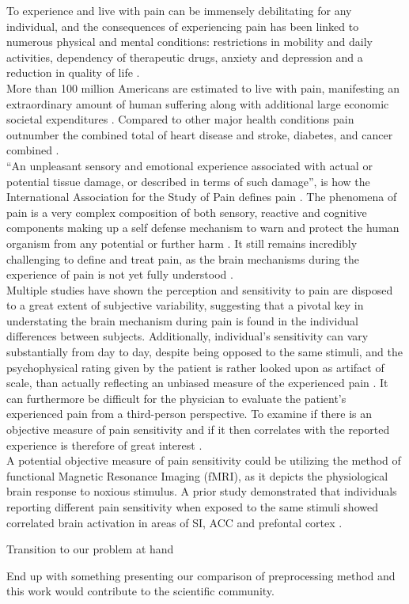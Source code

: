 
To experience and live with pain can be immensely debilitating for any individual, and the consequences of experiencing pain has been linked to numerous physical and mental conditions: restrictions in mobility and daily activities, dependency of therapeutic drugs, anxiety and depression and a reduction in quality of life \cite{Dahlhamer2018,NationalCenterforHealthStatisticsHealth2011}. \\ More than 100 million Americans are estimated to live with pain, manifesting an extraordinary amount of human suffering along with additional large economic societal expenditures \cite{InstituteofMedicine2011}. Compared to other major health conditions pain outnumber the combined total of heart disease and stroke, diabetes, and cancer combined \cite{NationalCenterforHealthStatisticsHealth2011}. \\
“An unpleasant sensory and emotional experience associated with actual or potential tissue damage, or described in terms of such damage”, is how the International Association for the Study of Pain defines pain \cite{Merskey1994}. The phenomena of pain is a very complex composition of both sensory, reactive and cognitive components making up a self defense mechanism to warn and protect the human organism from any potential or further harm \cite{Brook2011,Garland2013}. It still remains incredibly challenging to define and treat pain, as the brain mechanisms during the experience of pain is not yet fully understood \cite{Nielsen2008,Coghill2011}. \\
Multiple studies \cite{Coghill2003,Kim2004,Emerson2014} have shown the perception and sensitivity to pain are disposed to a great extent of subjective variability, suggesting that a pivotal key in understating the brain mechanism during pain is found in the individual differences between subjects. Additionally, individual's sensitivity can vary substantially from day to day, despite being opposed to the same stimuli, and the psychophysical rating given by the patient is rather looked upon as artifact of scale, than actually reflecting an unbiased measure of the experienced pain \cite{Coghill2003}. It can furthermore be difficult for the physician to evaluate the patient's experienced pain from a third-person perspective. To examine if there is an objective measure of pain sensitivity and if it then correlates with the reported experience is therefore of great interest \cite{Coghill2003}. \\ 
A potential objective measure of pain sensitivity could be utilizing the method of functional Magnetic Resonance Imaging (fMRI), as it depicts the physiological brain response to noxious stimulus. A prior study \cite{Coghill2003} demonstrated that individuals reporting different pain sensitivity when exposed to the same stimuli showed correlated brain activation in areas of SI, ACC and prefontal cortex .

Transition to our problem at hand

End up with something presenting our comparison of preprocessing method and this work 
would contribute to the scientific community.  






